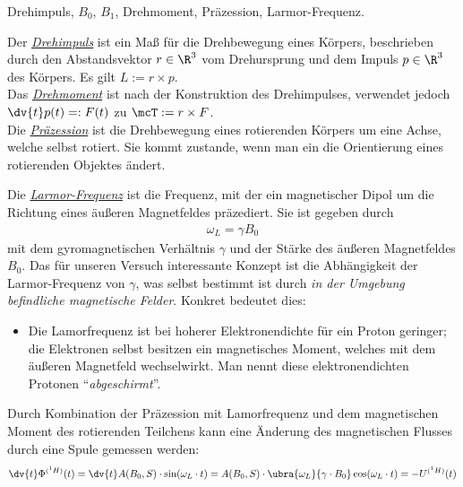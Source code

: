 \documentclass{subfiles}
\begin{document}
    \begin{Frage}
        Drehimpuls, $B_0$, $B_1$, Drehmoment, Präzession, Larmor-Frequenz.
    \end{Frage}
    \begin{Antwort}
        Der \href{https://de.wikipedia.org/wiki/Drehimpuls}{\emph{Drehimpuls}} ist ein Maß für die Drehbewegung eines Körpers, beschrieben durch den Abstandsvektor $r\in\R^3$ vom Drehursprung und dem Impuls $p\in\R^3$ des Körpers. Es gilt $L := r\times p$.\\

        Das \href{https://de.wikipedia.org/wiki/Drehmoment}{\emph{Drehmoment}} ist nach der Konstruktion des Drehimpulses, verwendet jedoch $\dv{t}p(t) =: F(t)$ zu $\mcT := r\times F$. \\

        Die \href{https://de.wikipedia.org/w/index.php?title=Präzession&oldid=235094402}{\emph{Präzession}} ist die Drehbewegung eines rotierenden Körpers um eine Achse, welche selbst rotiert. Sie kommt zustande, wenn man ein die Orientierung eines rotierenden Objektes ändert. \

        Die \href{https://de.wikipedia.org/wiki/Larmorpräzession}{\emph{Larmor-Frequenz}} ist die Frequenz, mit der ein magnetischer Dipol um die Richtung eines äußeren Magnetfeldes präzediert. Sie ist gegeben durch
        \begin{align}
            \omega_L = \gamma B_0\label{eq:LarmorFrequenz}
        \end{align}
        mit dem gyromagnetischen Verhältnis $\gamma$ und der Stärke des äußeren Magnetfeldes $B_0$. Das für unseren Versuch interessante Konzept ist die Abhängigkeit der Larmor-Frequenz von $\gamma$, was selbst bestimmt ist durch \emph{in der Umgebung befindliche magnetische Felder}. Konkret bedeutet dies:
        \begin{itemize}[label=$\to$]
            \item Die Lamorfrequenz ist bei hoherer Elektronendichte für ein Proton geringer; die Elektronen selbst besitzen ein magnetisches Moment, welches mit dem äußeren Magnetfeld wechselwirkt. Man nennt diese elektronendichten Protonen \enquote{\emph{abgeschirmt}}.
        \end{itemize}

        Durch Kombination der Präzession mit Lamorfrequenz und dem magnetischen Moment des rotierenden Teilchens kann eine Änderung des magnetischen Flusses durch eine Spule gemessen werden:
        \begin{align}
            \dv{t}\Phi^{(^1H)}(t) = \dv{t}A(B_0,S)\cdot\sin(\omega_L\cdot t) = A(B_0,S)\cdot\ubra{\omega_L}{\gamma\cdot B_0}\cos(\omega_L\cdot t) = -U^{(^1H)}(t)
        \end{align}
    \end{Antwort}
\end{document}

